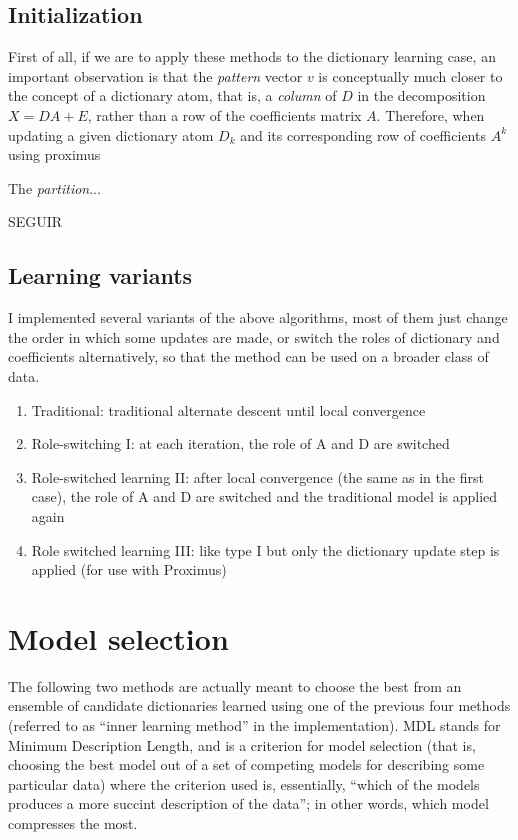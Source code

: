 \documentclass[a4paper]{IEEEtran}
\begin{document}
\subsection{Initialization}

First of all, if we are to apply these methods to the dictionary learning case, an important observation is that the \emph{pattern} vector $v$ is conceptually much closer to the concept of a dictionary atom, that is, a \emph{column} of $D$ in the decomposition $X=DA+E$, rather than a row of the coefficients matrix $A$. Therefore, when updating a given dictionary atom $D_k$ and its corresponding row of coefficients $A^k$ using proximus

The \emph{partition}...

SEGUIR


\subsection{Learning variants}

I implemented several variants of the above algorithms, most of them just change the order in which some updates are made, or switch the roles of dictionary and coefficients alternatively, so that the method can be used on a broader class of data.
 

\begin{enumerate}
\item Traditional: traditional alternate descent until local convergence
\item Role-switching I: at each iteration, the role of A and D are switched
\item Role-switched learning II: after local convergence (the same as in the first case), the role of A and D are switched and the traditional model is applied again
\item Role switched learning III: like type I but only the dictionary update step is applied (for use with Proximus)
\end{enumerate}

\section{Model selection}

The following two methods are actually meant to choose the best from an ensemble of candidate dictionaries learned using one of the previous four methods (referred to as ``inner learning method'' in the implementation). MDL stands for Minimum Description Length, and is a criterion for model selection (that is, choosing the best model out of a set of competing models for describing some particular data) where the criterion used is, essentially, ``which of the models produces a more succint description of the data''; in other words, which model compresses the most.
 
\end{document}
